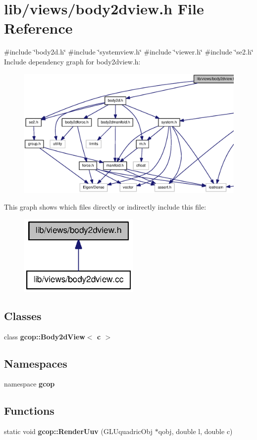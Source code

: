 \section{lib/views/body2dview.h \-File \-Reference}
\label{body2dview_8h}
{\ttfamily \#include \char`\"{}body2d.\-h\char`\"{}}\*
{\ttfamily \#include \char`\"{}systemview.\-h\char`\"{}}\*
{\ttfamily \#include \char`\"{}viewer.\-h\char`\"{}}\*
{\ttfamily \#include \char`\"{}se2.\-h\char`\"{}}\*
\-Include dependency graph for body2dview.\-h\-:
\nopagebreak
\begin{figure}[H]
\begin{center}
\leavevmode
\includegraphics[width=350pt]{body2dview_8h__incl}
\end{center}
\end{figure}
\-This graph shows which files directly or indirectly include this file\-:
\nopagebreak
\begin{figure}[H]
\begin{center}
\leavevmode
\includegraphics[width=166pt]{body2dview_8h__dep__incl}
\end{center}
\end{figure}
\subsection*{\-Classes}
\begin{DoxyCompactItemize}
\item 
class {\bf gcop\-::\-Body2d\-View$<$ c $>$}
\end{DoxyCompactItemize}
\subsection*{\-Namespaces}
\begin{DoxyCompactItemize}
\item 
namespace {\bf gcop}
\end{DoxyCompactItemize}
\subsection*{\-Functions}
\begin{DoxyCompactItemize}
\item 
static void {\bf gcop\-::\-Render\-Uuv} (\-G\-L\-Uquadric\-Obj $\ast$qobj, double l, double c)
\end{DoxyCompactItemize}
